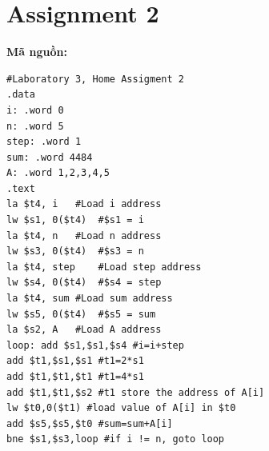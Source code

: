 \documentclass[12pt,a4paper,oneside]{article}
\begin{document}
\section{Assignment 2}
\textbf{Mã nguồn:}
\begin{center}
\begin{lstlisting}
#Laboratory 3, Home Assigment 2
.data 
i: .word 0
n: .word 5
step: .word 1
sum: .word 4484
A: .word 1,2,3,4,5 
.text
la $t4, i	#Load i address
lw $s1, 0($t4)	#$s1 = i
la $t4, n	#Load n address
lw $s3, 0($t4)	#$s3 = n
la $t4, step	#Load step address
lw $s4, 0($t4)	#$s4 = step
la $t4, sum	#Load sum address
lw $s5, 0($t4)	#$s5 = sum
la $s2, A	#Load A address
loop: add $s1,$s1,$s4 #i=i+step
add $t1,$s1,$s1 #t1=2*s1
add $t1,$t1,$t1 #t1=4*s1
add $t1,$t1,$s2 #t1 store the address of A[i]
lw $t0,0($t1) #load value of A[i] in $t0
add $s5,$s5,$t0 #sum=sum+A[i]
bne $s1,$s3,loop #if i != n, goto loop
\end{lstlisting}
\end{center}
\end{document}
